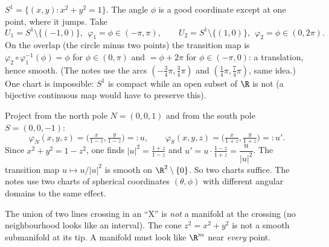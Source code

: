 \begin{example}
$S^1=\{(x,y):x^2+y^2=1\}$. The angle $\phi$ is a good coordinate except at one point, where it jumps. Take
\[
U_1=S^1\setminus\{(-1,0)\},\ \ \varphi_1=\phi\in(-\pi,\pi),\qquad
U_2=S^1\setminus\{(1,0)\},\ \ \varphi_2=\phi\in(0,2\pi).
\]
On the overlap (the circle minus two points) the transition map is $\varphi_2\circ\varphi_1^{-1}(\phi)=\phi$ for $\phi\in(0,\pi)$ and $=\phi+2\pi$ for $\phi\in(-\pi,0)$: a translation, hence smooth. (The notes use the arcs $(-\tfrac34\pi,\tfrac34\pi)$ and $(\tfrac14\pi,\tfrac74\pi)$, same idea.) One chart is impossible: $S^1$ is compact while an open subset of $\R$ is not (a bijective continuous map would have to preserve this).
\end{example}

\begin{example}
Project from the north pole $N=(0,0,1)$ and from the south pole $S=(0,0,-1)$:
\[
\varphi_N(x,y,z)=\Big(\tfrac{x}{1-z},\tfrac{y}{1-z}\Big)=:u,\qquad
\varphi_S(x,y,z)=\Big(\tfrac{x}{1+z},\tfrac{y}{1+z}\Big)=:u'.
\]
Since $x^2+y^2=1-z^2$, one finds $|u|^2=\frac{1+z}{1-z}$ and $u'=u\cdot\frac{1-z}{1+z}=\dfrac{u}{|u|^2}$.
The transition map $u\mapsto u/|u|^2$ is smooth on $\R^2\setminus\{0\}$. So two charts suffice. The notes use two charts of spherical coordinates $(\theta,\phi)$ with different angular domains to the same effect.
\end{example}

\begin{pitfall}
The union of two lines crossing in an ``X'' is \emph{not} a manifold at the crossing (no neighbourhood looks like an interval). The cone $z^2=x^2+y^2$ is not a smooth submanifold at its tip. A manifold must look like $\R^m$ near \emph{every} point.
\end{pitfall}
